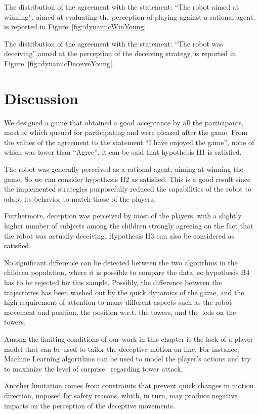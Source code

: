 The distribution of the agreement with the statement: ``The robot aimed at winning'', aimed at evaluating the perception of playing against a rational agent, is reported in Figure~\ref{fig::dynamicWinYoung}.

The distribution of the agreement with the statement: ``The robot was deceiving'',aimed at the perception of the deceiving strategy, is reported in Figure~\ref{fig::dynamicDeceiveYoung}.

\section{Discussion}
\label{sec:deception_discussion}
We designed a game that obtained a good acceptance by all the participants, most of which queued for participating and were pleased after the game. From the values of the agreement to the statement ``I have enjoyed the game'', none of which was lower than ``Agree'', it can be said that hypothesis H1 is satisfied.  


The robot was generally perceived as a rational agent, aiming at winning the game. So we can consider hypothesis H2 as satisfied. This is a good result since the implemented strategies purposefully reduced the capabilities of the robot to adapt its behavior to match those of the players.

Furthermore, deception was perceived by most of the players, with a slightly higher number of subjects among the children strongly agreeing on the fact that the robot was actually deceiving. Hypothesis H3 can also be considered as satisfied.

No significant difference can be detected between the two algorithms in the children population, where it is possible to compare the data, so hypothesis H4 has to be rejected for this sample. Possibly, the difference between the trajectories has been washed out by the quick dynamics of the game, and the high requirement of attention to many different aspects such as the robot movement and position, the position w.r.t. the towers, and the~\gls{led}s on the towers.

Among the limiting conditions of our work in this chapter is the lack of a player model that can be used to tailor the deceptive motion on line. For instance, Machine Learning algorithms can be used to model the player's actions and try to maximize the level of surprise~\citep{baldi_bits_2010} regarding tower attack.

Another limitation comes from constraints that prevent quick changes in motion direction, imposed for safety reasons, which, in turn, may produce negative impacts on the perception of the deceptive movements.
